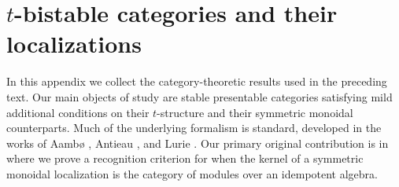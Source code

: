 \appendix
{}
\section{\texorpdfstring{$t$}{t}-bistable categories and their localizations}\label{app: categories}
In this appendix we collect the category-theoretic results used in the preceding text. Our main objects of study are stable presentable categories satisfying mild additional conditions on their $t$-structure and their symmetric monoidal counterparts. Much of the underlying formalism is standard, developed in the works of Aambø \cite{LocalizingTStruct}, Antieau \cite{AntieauEnhancements}, and Lurie \cite{HA, SAG}. Our primary original contribution is in  where we prove a recognition criterion for when the kernel of a symmetric monoidal localization is the category of modules over an idempotent algebra. 
